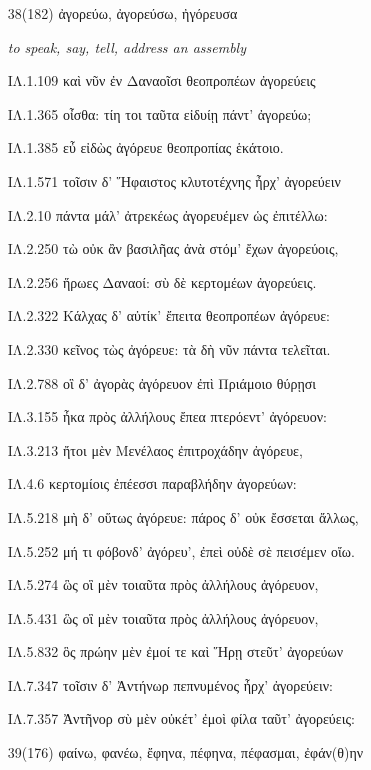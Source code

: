 \begin{enumerate}
{ΙΛ.6.235 ὃς πρὸς Τυδεΐδην Διομήδεα τεύχε' ἄμειβε

ΙΛ.6.263 τὴν δ' ἠμείβετ' ἔπειτα μέγας κορυθαίολος Ἕκτωρ:

ΙΛ.6.359 τὴν δ' ἠμείβετ' ἔπειτα μέγας κορυθαίολος Ἕκτωρ:

}

\clearpage
\item[\large 38(182)]{\large \g ἀγορεύω, ἀγορεύσω, ἠγόρευσα }

\hspace{0.2cm} \textit{ to speak, say, tell, address an assembly  }

{\g
ΙΛ.1.109 καὶ νῦν ἐν Δαναοῖσι θεοπροπέων ἀγορεύεις

ΙΛ.1.365 οἶσθα: τίη τοι ταῦτα εἰδυίῃ πάντ' ἀγορεύω;

ΙΛ.1.385 εὖ εἰδὼς ἀγόρευε θεοπροπίας ἑκάτοιο.

ΙΛ.1.571 τοῖσιν δ' Ἥφαιστος κλυτοτέχνης ἦρχ' ἀγορεύειν

ΙΛ.2.10 πάντα μάλ' ἀτρεκέως ἀγορευέμεν ὡς ἐπιτέλλω:

ΙΛ.2.250 τὼ οὐκ ἂν βασιλῆας ἀνὰ στόμ' ἔχων ἀγορεύοις,

ΙΛ.2.256 ἥρωες Δαναοί: σὺ δὲ κερτομέων ἀγορεύεις.

ΙΛ.2.322 Κάλχας δ' αὐτίκ' ἔπειτα θεοπροπέων ἀγόρευε:

ΙΛ.2.330 κεῖνος τὼς ἀγόρευε: τὰ δὴ νῦν πάντα τελεῖται.

ΙΛ.2.788 οἳ δ' ἀγορὰς ἀγόρευον ἐπὶ Πριάμοιο θύρῃσι

ΙΛ.3.155 ἦκα πρὸς ἀλλήλους ἔπεα πτερόεντ' ἀγόρευον:

ΙΛ.3.213 ἤτοι μὲν Μενέλαος ἐπιτροχάδην ἀγόρευε,

ΙΛ.4.6 κερτομίοις ἐπέεσσι παραβλήδην ἀγορεύων:

ΙΛ.5.218 μὴ δ' οὕτως ἀγόρευε: πάρος δ' οὐκ ἔσσεται ἄλλως,

ΙΛ.5.252 μή τι φόβονδ' ἀγόρευ', ἐπεὶ οὐδὲ σὲ πεισέμεν οἴω.

ΙΛ.5.274 ὣς οἳ μὲν τοιαῦτα πρὸς ἀλλήλους ἀγόρευον,

ΙΛ.5.431 ὣς οἳ μὲν τοιαῦτα πρὸς ἀλλήλους ἀγόρευον,

ΙΛ.5.832 ὃς πρώην μὲν ἐμοί τε καὶ Ἥρῃ στεῦτ' ἀγορεύων

ΙΛ.7.347 τοῖσιν δ' Ἀντήνωρ πεπνυμένος ἦρχ' ἀγορεύειν:

ΙΛ.7.357 Ἀντῆνορ σὺ μὲν οὐκέτ' ἐμοὶ φίλα ταῦτ' ἀγορεύεις:
}

\clearpage
\item[\large 39(176)]{\large\g φαίνω, φανέω, ἔφηνα, πέφηνα, πέφασμαι, ἐφάν(θ)ην}


\end{enumerate}

